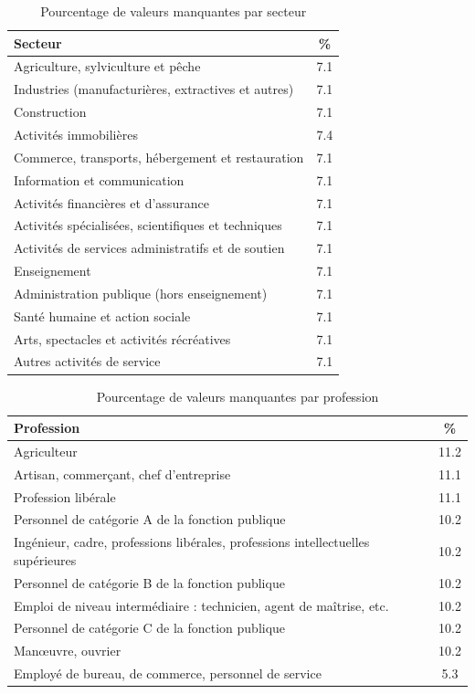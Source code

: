 \documentclass[12pt, a4paper, titlepage, table]{article}
\begin{document}
\begin{table}[H]
	\centering
	\begin{tabularx}{\textwidth}{|X|c|}
		\hline
		\textbf{Secteur} & \textbf{\%} \\
		\hline
		Agriculture, sylviculture et pêche & 7.1 \\
		\hline
		Industries (manufacturières, extractives et autres) & 7.1 \\
		\hline
		Construction & 7.1 \\
		\hline
		Activités immobilières & 7.4 \\
		\hline
		Commerce, transports, hébergement et restauration & 7.1 \\
		\hline
		Information et communication & 7.1 \\
		\hline
		Activités financières et d’assurance & 7.1 \\
		\hline
		Activités spécialisées, scientifiques et techniques & 7.1 \\
		\hline
		Activités de services administratifs et de soutien & 7.1 \\
		\hline
		Enseignement & 7.1 \\
		\hline
		Administration publique (hors enseignement) & 7.1 \\
		\hline
		Santé humaine et action sociale & 7.1 \\
		\hline
		Arts, spectacles et activités récréatives & 7.1 \\
		\hline
		Autres activités de service & 7.1 \\
		\hline
	\end{tabularx}
	\caption{Pourcentage de valeurs manquantes par secteur}
	\label{tab:secteurs_pourcentage}
\end{table}

\begin{table}[H]
	\centering
	\begin{tabularx}{\textwidth}{|X|c|}
		\hline
		\textbf{Profession} & \textbf{\%} \\
		\hline
		Agriculteur & 11.2 \\
		\hline
		Artisan, commerçant, chef d'entreprise & 11.1 \\
		\hline
		Profession libérale & 11.1 \\
		\hline
		Personnel de catégorie A de la fonction publique & 10.2 \\
		\hline
		Ingénieur, cadre, professions libérales, professions intellectuelles supérieures & 10.2 \\
		\hline
		Personnel de catégorie B de la fonction publique & 10.2 \\
		\hline
		Emploi de niveau intermédiaire : technicien, agent de maîtrise, etc. & 10.2 \\
		\hline
		Personnel de catégorie C de la fonction publique & 10.2 \\
		\hline
		Manœuvre, ouvrier & 10.2 \\
		\hline
		Employé de bureau, de commerce, personnel de service & 5.3 \\
		\hline
	\end{tabularx}
	\caption{Pourcentage de valeurs manquantes par profession}
	\label{tab:professions_pourcentage}
\end{table}
\end{document}
